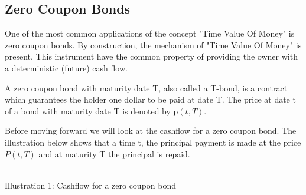 \subsection{Zero Coupon Bonds}
One of the most common applications of the concept "Time Value Of Money" is zero coupon bonds. 
By construction, the mechanism of "Time Value Of Money" is present. This instrument 
have the common property of providing the owner with a deterministic (future) cash flow. 
\begin{definition}\label{def:zcb}
    A zero coupon bond with maturity date T, also called a T-bond, is a contract which 
    guarantees the holder one dollar to be paid at date T. The price at date t of 
    a bond with maturity date T is denoted by p$(t,T)$. \cite{Bjork} 
\end{definition} 
\noindent
Before moving forward we will look at the cashflow for a zero coupon bond. The illustration below shows that a time t,
the principal payment is made at the price $P(t,T)$ and at maturity T the principal is repaid.
\begin{center}
    \\[10pt] 
    Illustration 1: Cashflow for a zero coupon bond
\end{center}

